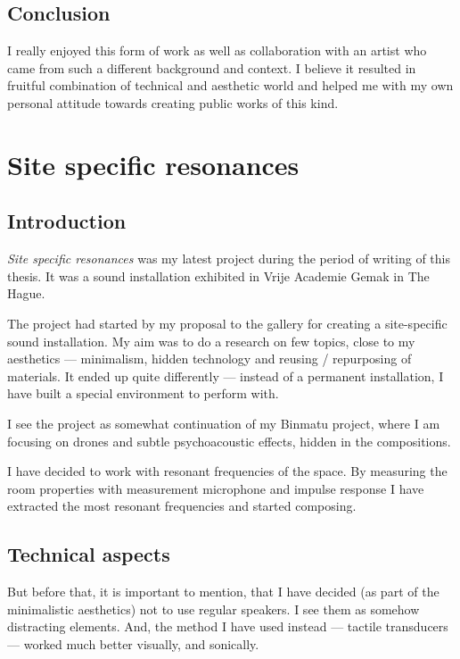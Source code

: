 \documentclass[12pt,a4paper,oneside]{report}
\begin{document}
\subsection{Conclusion}

I really enjoyed this form of work as well as collaboration with an artist who came from such a different background and context. I believe it resulted in fruitful combination of technical and aesthetic world and helped me with my own personal attitude towards creating public works of this kind.


\section{Site specific resonances}

\subsection{Introduction}

\emph{Site specific resonances} was my latest project during the period of writing of this thesis. It was a sound installation exhibited in Vrije Academie Gemak in The Hague.

The project had started by my proposal to the gallery for creating a site-specific sound installation. My aim was to do a research on few topics, close to my aesthetics --- minimalism, hidden technology and reusing / repurposing of materials. It ended up quite differently --- instead of a permanent installation, I have built a special environment to perform with. 

I see the project as somewhat continuation of my Binmatu project, where I am focusing on drones and subtle psychoacoustic effects, hidden in the compositions.

I have decided to work with resonant frequencies of the space. By measuring the room properties with measurement microphone and impulse response I have extracted the most resonant frequencies and started composing.

\subsection{Technical aspects}

But before that, it is important to mention, that I have decided (as part of the minimalistic aesthetics) not to use regular speakers. I see them as somehow distracting elements. And, the method I have used instead --- tactile transducers --- worked much better visually, and sonically.
\end{document}
